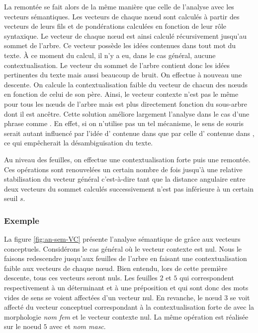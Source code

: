 La remontée se fait alors de la même manière que celle de l'analyse
avec les  vecteurs sémantiques. Les
vecteurs de chaque n\oe ud sont calculés à partir des vecteurs de
leurs fils et de pondérations calculées en fonction de leur rôle
syntaxique. Le vecteur de chaque n\oe ud est ainsi calculé
récursivement jusqu'au sommet de l'arbre. Ce vecteur possède les idées
contenues dans tout mot du texte. À ce moment du calcul, il n'y a eu,
dans le cas général, aucune contextualisation. Le vecteur du sommet de
l'arbre contient donc les idées pertinentes du texte mais aussi
beaucoup de bruit. On effectue à nouveau une descente. On calcule la
contextualisation faible du vecteur de chacun des n\oe uds en fonction
de celui de son père.  Ainsi, le vecteur contexte n'est pas le même
pour tous les n\oe uds de l'arbre mais est plus directement fonction
du sous-arbre dont il est ancêtre. Cette solution améliore largement
l'analyse dans le cas d'une phrase comme . En effet, si
on n'utilise pas un tel mécanisme, le sens de souris serait autant
influencé par l'idée d' contenue dans
 que par celle d' contenue dans
, ce qui empêcherait la désambiguïsation du texte.

Au niveau des feuilles, on effectue une contextualisation forte puis
une remontée. Ces opérations sont renouvelées un certain nombre de
fois jusqu'à une relative stabilisation du vecteur général
c'est-à-dire tant que la distance angulaire entre deux vecteurs du
sommet calculés successivement n'est pas inférieure à un certain seuil
$s$.

\subsubsection{Exemple}

La figure
\ref{fig:an-sem-VC} présente l'analyse sémantique de  grâce aux
 vecteurs conceptuels. Considérons le cas
général où le vecteur contexte est nul. Nous le faisons redescendre
jusqu'aux feuilles de l'arbre en faisant une contextualisation faible
aux vecteurs de chaque n\oe ud.  Bien entendu, lors de cette première
descente, tous ces vecteurs seront nuls. Les feuilles $2$ et $5$ qui
correspondent respectivement à un déterminant et à une préposition et
qui sont donc des mots vides de sens se voient affectées d'un vecteur
nul. En revanche, le n\oe ud $3$ se voit affecté du vecteur conceptuel
correspondant à la contextualisation forte de  avec la
morphologie \emph{nom fem} et le vecteur contexte nul. La même
opération est réalisée sur le noeud $5$ avec  et
\emph{nom masc}.

